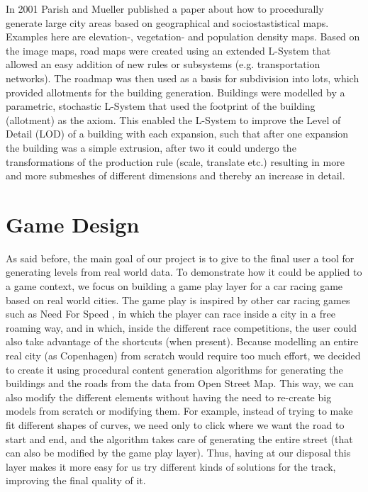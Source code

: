 \documentclass[conference]{IEEEtran}
\begin{document}
\newline
\newline
In 2001 Parish and Mueller \cite{parish} published a paper about how to procedurally generate large city areas based on geographical and sociostastistical maps. Examples here are elevation-, vegetation- and population density maps. Based on the image maps, road maps were created using an extended L-System that allowed an easy addition of new rules or subsystems (e.g. transportation networks). The roadmap was then used as a basis for subdivision into lots, which provided allotments for the building generation. Buildings were modelled by a parametric, stochastic L-System that used the footprint of the building (allotment) as the axiom. This enabled the L-System to improve the Level of Detail (LOD) of a building with each expansion, such that after one expansion the building was a simple extrusion, after two it could undergo the transformations of the production rule (scale, translate etc.) resulting in more and more submeshes of different dimensions and thereby an increase in detail.


\section{Game Design}

As said before, the main goal of our project is to give to the final user a tool for generating levels from real world data. To demonstrate how it could be applied to a game context, we focus on building a game play layer for a car racing game based on real world cities. The game play is inspired by other car racing games such as Need For Speed \cite{nfs}, in which the player can race inside a city in a free roaming way, and in which, inside the different race competitions, the user could also take advantage of the shortcuts (when present). Because modelling an entire real city (as Copenhagen) from scratch would require too much effort, we decided to create it using procedural content generation algorithms for generating the buildings and the roads from the data from Open Street Map. This way, we can also modify the different elements without having the need to re-create big models from scratch or modifying them. For example, instead of trying to make fit different shapes of curves, we need only to click where we want the road to start and end, and the algorithm takes care of generating the entire street (that can also be modified by the game play layer). Thus, having at our disposal this layer makes it more easy for us try different kinds of solutions for the track, improving the final quality of it.
\end{document}
